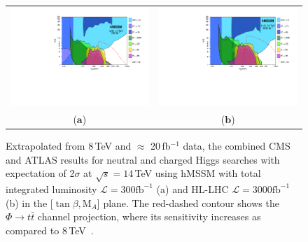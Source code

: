 \begin{figure}[htp]
\centering
\begin{tabular}{cc}
\hspace{-0.3cm}
\includegraphics[trim={0cm 0.0cm 0 0},clip, scale=0.43]{fig/sm_beyond/httplots_constraints_LHC14_300fb_all.pdf}
& \hspace{-2.2cm} \includegraphics[trim={0cm 0.0cm 0 0},clip, scale=0.43]{fig/sm_beyond/httplots_constraints_LHC14_3000fb_all.pdf}\\
  \qquad ($\mathbf{a}$)\qquad\qquad&($\mathbf{b}$)\qquad\qquad\qquad\qquad \\
\end{tabular}
\caption{Extrapolated from 8\,TeV and $\approx$ 20\,fb$^{-1}$ data, the combined CMS and ATLAS results for neutral and charged Higgs searches with expectation of 2$\sigma$ at $\sqrt{s}=14$\,TeV using hMSSM with total integrated luminosity $\mathcal{L}=300 \text{f}\text{b}^{-1}$ (a) and  HL-LHC $\mathcal{L}=3000 \text{f}\text{b}^{-1}$ (b) in the [$\tan\beta, \text{M}_{A}$] plane. The red-dashed contour shows the $\Phi\rightarrow t\bar{t}$ channel projection, where its sensitivity increases as compared to 8\,TeV~\cite{Djouadi:2015jea}. }\label{fig:heavy_higgs14tev_exclusion}
\end{figure} 
